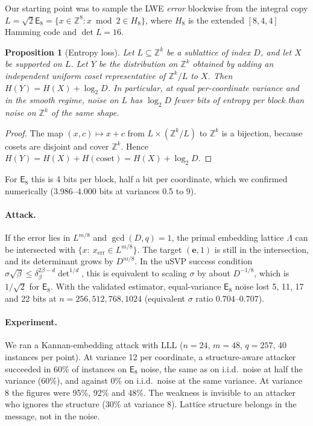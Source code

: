 \documentclass[11pt,a4paper]{article}
\newtheorem{proposition}[theorem]{Proposition}
\theoremstyle{definition}
\theoremstyle{remark}
\newcommand{\Z}{\mathbb{Z}}
\newcommand{\E}{\mathsf{E}_8}
\newcommand{\lt}{\log_2}
\begin{document}
Our starting point was to sample the LWE \emph{error} blockwise from the integral copy $L=\sqrt2\E=\{x\in\Z^8:x\bmod2\in H_8\}$, where $H_8$ is the extended $[8,4,4]$ Hamming code and $\det L=16$.

\begin{proposition}[Entropy loss]\label{prop:entropy}
Let $L\subseteq\Z^k$ be a sublattice of index $D$, and let $X$ be supported on $L$. Let $Y$ be the distribution on $\Z^k$ obtained by adding an independent uniform coset representative of $\Z^k/L$ to $X$. Then $H(Y)=H(X)+\lt D$. In particular, at equal per-coordinate variance and in the smooth regime, noise on $L$ has $\lt D$ fewer bits of entropy per block than noise on $\Z^k$ of the same shape.
\end{proposition}
\begin{proof}
The map $(x,c)\mapsto x+c$ from $L\times(\Z^k/L)$ to $\Z^k$ is a bijection, because cosets are disjoint and cover $\Z^k$. Hence $H(Y)=H(X)+H(\text{coset})=H(X)+\lt D$.
\end{proof}

For $\E$ this is 4 bits per block, half a bit per coordinate, which we confirmed numerically (3.986--4.000 bits at variances 0.5 to 9).

\paragraph{Attack.} If the error lies in $L^{m/8}$ and $\gcd(D,q)=1$, the primal embedding lattice $\Lambda$ can be intersected with $\{x:\ x_{\text{err}}\in L^{m/8}\}$. The target $(\mathbf e,1)$ is still in the intersection, and its determinant grows by $D^{m/8}$. In the uSVP success condition $\sigma\sqrt\beta\le\delta_\beta^{2\beta-d}\det^{1/d}$, this is equivalent to scaling $\sigma$ by about $D^{-1/8}$, which is $1/\sqrt2$ for $\E$. With the validated estimator, equal-variance $\E$ noise lost 5, 11, 17 and 22 bits at $n=256,512,768,1024$ (equivalent $\sigma$ ratio $0.704$--$0.707$).

\paragraph{Experiment.} We ran a Kannan-embedding attack with LLL ($n=24$, $m=48$, $q=257$, 40 instances per point). At variance 12 per coordinate, a structure-aware attacker succeeded in 60\% of instances on $\E$ noise, the same as on i.i.d.\ noise at half the variance (60\%), and against 0\% on i.i.d.\ noise at the same variance. At variance 8 the figures were 95\%, 92\% and 48\%. The weakness is invisible to an attacker who ignores the structure (30\% at variance 8). Lattice structure belongs in the message, not in the noise.
\end{document}
